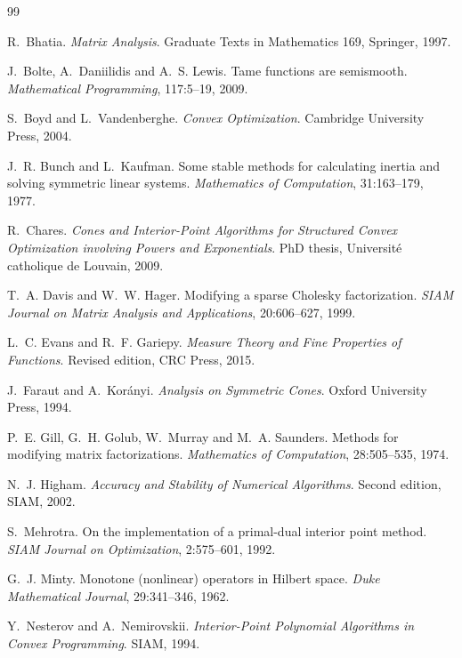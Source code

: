 \documentclass[a4paper,11pt]{book}
\theoremstyle{plain}
\theoremstyle{definition}
\theoremstyle{remark}
\numberwithin{equation}{chapter}
\numberwithin{algorithm}{chapter}
\begin{document}
	\begin{thebibliography}{99}
		
		R.~Bhatia. \emph{Matrix Analysis}. Graduate Texts in Mathematics 169,
		Springer, 1997.
		
		J.~Bolte, A.~Daniilidis and A.~S. Lewis. Tame functions are semismooth.
		\emph{Mathematical Programming}, 117:5--19, 2009.
		
		S.~Boyd and L.~Vandenberghe. \emph{Convex Optimization}. Cambridge University
		Press, 2004.
		
		J.~R. Bunch and L.~Kaufman. Some stable methods for calculating inertia and
		solving symmetric linear systems. \emph{Mathematics of Computation},
		31:163--179, 1977.
		
		R.~Chares. \emph{Cones and Interior-Point Algorithms for Structured Convex
			Optimization involving Powers and Exponentials}. PhD thesis, Universit\'e
		catholique de Louvain, 2009.
		
		T.~A. Davis and W.~W. Hager. Modifying a sparse Cholesky factorization.
		\emph{SIAM Journal on Matrix Analysis and Applications}, 20:606--627, 1999.
		
		L.~C. Evans and R.~F. Gariepy. \emph{Measure Theory and Fine Properties of
			Functions}. Revised edition, CRC Press, 2015.
		
		J.~Faraut and A.~Kor\'anyi. \emph{Analysis on Symmetric Cones}. Oxford
		University Press, 1994.
		
		P.~E. Gill, G.~H. Golub, W.~Murray and M.~A. Saunders. Methods for modifying
		matrix factorizations. \emph{Mathematics of Computation}, 28:505--535, 1974.
		
		N.~J. Higham. \emph{Accuracy and Stability of Numerical Algorithms}. Second
		edition, SIAM, 2002.
		
		S.~Mehrotra. On the implementation of a primal-dual interior point method.
		\emph{SIAM Journal on Optimization}, 2:575--601, 1992.
		
		G.~J. Minty. Monotone (nonlinear) operators in Hilbert space. \emph{Duke
			Mathematical Journal}, 29:341--346, 1962.
		
		Y.~Nesterov and A.~Nemirovskii. \emph{Interior-Point Polynomial Algorithms in
			Convex Programming}. SIAM, 1994.
		

\end{thebibliography}
\end{document}
